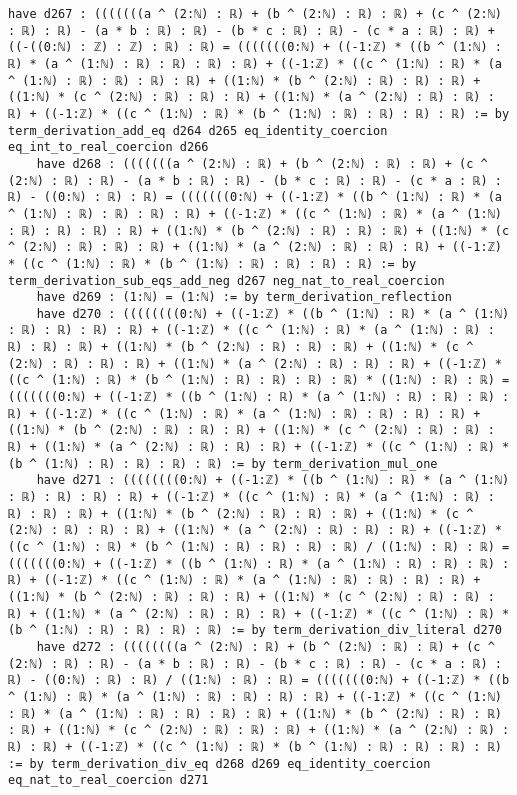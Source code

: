 \documentclass{article}
\begin{document}
\begin{tcolorbox}[colback=white!10, width=\linewidth]
\begin{lstlisting}[language=Lean4]
    have d267 : (((((((a ^ (2:ℕ) : ℝ) + (b ^ (2:ℕ) : ℝ) : ℝ) + (c ^ (2:ℕ) : ℝ) : ℝ) - (a * b : ℝ) : ℝ) - (b * c : ℝ) : ℝ) - (c * a : ℝ) : ℝ) + ((-((0:ℕ) : ℤ) : ℤ) : ℝ) : ℝ) = (((((((0:ℕ) + ((-1:ℤ) * ((b ^ (1:ℕ) : ℝ) * (a ^ (1:ℕ) : ℝ) : ℝ) : ℝ) : ℝ) + ((-1:ℤ) * ((c ^ (1:ℕ) : ℝ) * (a ^ (1:ℕ) : ℝ) : ℝ) : ℝ) : ℝ) + ((1:ℕ) * (b ^ (2:ℕ) : ℝ) : ℝ) : ℝ) + ((1:ℕ) * (c ^ (2:ℕ) : ℝ) : ℝ) : ℝ) + ((1:ℕ) * (a ^ (2:ℕ) : ℝ) : ℝ) : ℝ) + ((-1:ℤ) * ((c ^ (1:ℕ) : ℝ) * (b ^ (1:ℕ) : ℝ) : ℝ) : ℝ) : ℝ) := by term_derivation_add_eq d264 d265 eq_identity_coercion eq_int_to_real_coercion d266
    have d268 : (((((((a ^ (2:ℕ) : ℝ) + (b ^ (2:ℕ) : ℝ) : ℝ) + (c ^ (2:ℕ) : ℝ) : ℝ) - (a * b : ℝ) : ℝ) - (b * c : ℝ) : ℝ) - (c * a : ℝ) : ℝ) - ((0:ℕ) : ℝ) : ℝ) = (((((((0:ℕ) + ((-1:ℤ) * ((b ^ (1:ℕ) : ℝ) * (a ^ (1:ℕ) : ℝ) : ℝ) : ℝ) : ℝ) + ((-1:ℤ) * ((c ^ (1:ℕ) : ℝ) * (a ^ (1:ℕ) : ℝ) : ℝ) : ℝ) : ℝ) + ((1:ℕ) * (b ^ (2:ℕ) : ℝ) : ℝ) : ℝ) + ((1:ℕ) * (c ^ (2:ℕ) : ℝ) : ℝ) : ℝ) + ((1:ℕ) * (a ^ (2:ℕ) : ℝ) : ℝ) : ℝ) + ((-1:ℤ) * ((c ^ (1:ℕ) : ℝ) * (b ^ (1:ℕ) : ℝ) : ℝ) : ℝ) : ℝ) := by term_derivation_sub_eqs_add_neg d267 neg_nat_to_real_coercion
    have d269 : (1:ℕ) = (1:ℕ) := by term_derivation_reflection
    have d270 : ((((((((0:ℕ) + ((-1:ℤ) * ((b ^ (1:ℕ) : ℝ) * (a ^ (1:ℕ) : ℝ) : ℝ) : ℝ) : ℝ) + ((-1:ℤ) * ((c ^ (1:ℕ) : ℝ) * (a ^ (1:ℕ) : ℝ) : ℝ) : ℝ) : ℝ) + ((1:ℕ) * (b ^ (2:ℕ) : ℝ) : ℝ) : ℝ) + ((1:ℕ) * (c ^ (2:ℕ) : ℝ) : ℝ) : ℝ) + ((1:ℕ) * (a ^ (2:ℕ) : ℝ) : ℝ) : ℝ) + ((-1:ℤ) * ((c ^ (1:ℕ) : ℝ) * (b ^ (1:ℕ) : ℝ) : ℝ) : ℝ) : ℝ) * ((1:ℕ) : ℝ) : ℝ) = (((((((0:ℕ) + ((-1:ℤ) * ((b ^ (1:ℕ) : ℝ) * (a ^ (1:ℕ) : ℝ) : ℝ) : ℝ) : ℝ) + ((-1:ℤ) * ((c ^ (1:ℕ) : ℝ) * (a ^ (1:ℕ) : ℝ) : ℝ) : ℝ) : ℝ) + ((1:ℕ) * (b ^ (2:ℕ) : ℝ) : ℝ) : ℝ) + ((1:ℕ) * (c ^ (2:ℕ) : ℝ) : ℝ) : ℝ) + ((1:ℕ) * (a ^ (2:ℕ) : ℝ) : ℝ) : ℝ) + ((-1:ℤ) * ((c ^ (1:ℕ) : ℝ) * (b ^ (1:ℕ) : ℝ) : ℝ) : ℝ) : ℝ) := by term_derivation_mul_one
    have d271 : ((((((((0:ℕ) + ((-1:ℤ) * ((b ^ (1:ℕ) : ℝ) * (a ^ (1:ℕ) : ℝ) : ℝ) : ℝ) : ℝ) + ((-1:ℤ) * ((c ^ (1:ℕ) : ℝ) * (a ^ (1:ℕ) : ℝ) : ℝ) : ℝ) : ℝ) + ((1:ℕ) * (b ^ (2:ℕ) : ℝ) : ℝ) : ℝ) + ((1:ℕ) * (c ^ (2:ℕ) : ℝ) : ℝ) : ℝ) + ((1:ℕ) * (a ^ (2:ℕ) : ℝ) : ℝ) : ℝ) + ((-1:ℤ) * ((c ^ (1:ℕ) : ℝ) * (b ^ (1:ℕ) : ℝ) : ℝ) : ℝ) : ℝ) / ((1:ℕ) : ℝ) : ℝ) = (((((((0:ℕ) + ((-1:ℤ) * ((b ^ (1:ℕ) : ℝ) * (a ^ (1:ℕ) : ℝ) : ℝ) : ℝ) : ℝ) + ((-1:ℤ) * ((c ^ (1:ℕ) : ℝ) * (a ^ (1:ℕ) : ℝ) : ℝ) : ℝ) : ℝ) + ((1:ℕ) * (b ^ (2:ℕ) : ℝ) : ℝ) : ℝ) + ((1:ℕ) * (c ^ (2:ℕ) : ℝ) : ℝ) : ℝ) + ((1:ℕ) * (a ^ (2:ℕ) : ℝ) : ℝ) : ℝ) + ((-1:ℤ) * ((c ^ (1:ℕ) : ℝ) * (b ^ (1:ℕ) : ℝ) : ℝ) : ℝ) : ℝ) := by term_derivation_div_literal d270
    have d272 : ((((((((a ^ (2:ℕ) : ℝ) + (b ^ (2:ℕ) : ℝ) : ℝ) + (c ^ (2:ℕ) : ℝ) : ℝ) - (a * b : ℝ) : ℝ) - (b * c : ℝ) : ℝ) - (c * a : ℝ) : ℝ) - ((0:ℕ) : ℝ) : ℝ) / ((1:ℕ) : ℝ) : ℝ) = (((((((0:ℕ) + ((-1:ℤ) * ((b ^ (1:ℕ) : ℝ) * (a ^ (1:ℕ) : ℝ) : ℝ) : ℝ) : ℝ) + ((-1:ℤ) * ((c ^ (1:ℕ) : ℝ) * (a ^ (1:ℕ) : ℝ) : ℝ) : ℝ) : ℝ) + ((1:ℕ) * (b ^ (2:ℕ) : ℝ) : ℝ) : ℝ) + ((1:ℕ) * (c ^ (2:ℕ) : ℝ) : ℝ) : ℝ) + ((1:ℕ) * (a ^ (2:ℕ) : ℝ) : ℝ) : ℝ) + ((-1:ℤ) * ((c ^ (1:ℕ) : ℝ) * (b ^ (1:ℕ) : ℝ) : ℝ) : ℝ) : ℝ) := by term_derivation_div_eq d268 d269 eq_identity_coercion eq_nat_to_real_coercion d271

\end{lstlisting}
\end{tcolorbox}
\end{document}

